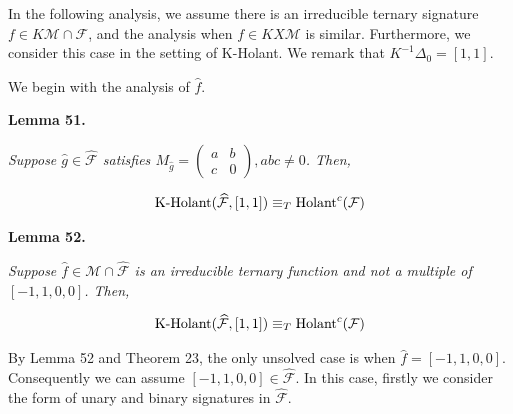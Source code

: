 In the following analysis, we assume there is an irreducible ternary signature $f\in K\mathcal{M}\cap\mathcal{F}$, and the analysis when $f\in KX\mathcal{M}$ is similar. Furthermore, we consider this case in the setting of K-Holant. We remark that $K^{-1}\Delta_{0}=[1,1]$.\par




We begin with the analysis of $\widehat{f}$.\par





\par\medskip\noindent\textbf{
\textbf{Lemma 51}\textbf{.}
}\par



\emph{Suppose $\widehat{g}\in\widehat{\mathcal{F}}$ satisfies $M_{\widehat{g}}=\begin{pmatrix}a&b\\
c&0\end{pmatrix},abc\neq 0$. Then,}\par


\[\begin{gathered}
\textup{{K-Holant}}(\widehat{\mathcal{F}},[1,1])\equiv_{T}\textup{{Holant}}^{c}(\mathcal{F})
\end{gathered}\]







\par\medskip\noindent\textbf{
\textbf{Lemma 52}\textbf{.}
}\par



\emph{Suppose $\widehat{f}\in\mathcal{M}\cap\widehat{\mathcal{F}}$ is an irreducible ternary function and not a multiple of $[-1,1,0,0]$. Then,}\par


\[\begin{gathered}
\textup{{K-Holant}}(\widehat{\mathcal{F}},[1,1])\equiv_{T}\textup{{Holant}}^{c}(\mathcal{F})
\end{gathered}\]






By Lemma 52 and Theorem 23, the only unsolved case is when $\widehat{f}=[-1,1,0,0]$. Consequently we can assume $[-1,1,0,0]\in\widehat{\mathcal{F}}$. In this case, firstly we consider the form of unary and binary signatures in $\widehat{\mathcal{F}}$.\par



